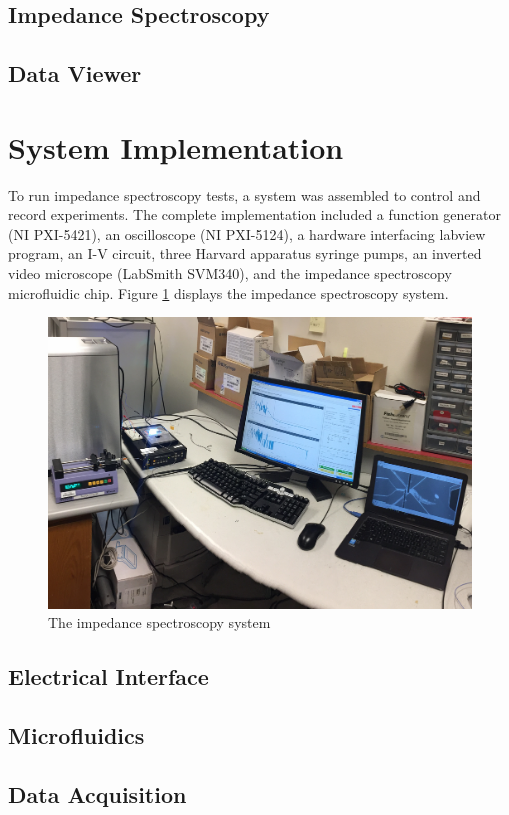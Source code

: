 \subsection{Impedance Spectroscopy}

\subsection{Data Viewer}



\section{System Implementation}
\par To run impedance spectroscopy tests, a system was assembled to control and record experiments. The complete implementation included a function generator (NI PXI-5421), an oscilloscope (NI PXI-5124), a hardware interfacing labview program, an I-V circuit, three Harvard apparatus syringe pumps, an inverted video microscope (LabSmith SVM340), and the impedance spectroscopy microfluidic chip. Figure \ref{fig:IS_system} displays the impedance spectroscopy system. 

\begin{figure}[h]
    \centering
    \includegraphics[width=\textwidth]{images/impedance_system}
    \caption{The impedance spectroscopy system}
    \label{fig:IS_system}
\end{figure}

\subsection{Electrical Interface}


\subsection{Microfluidics}

\subsection{Data Acquisition}